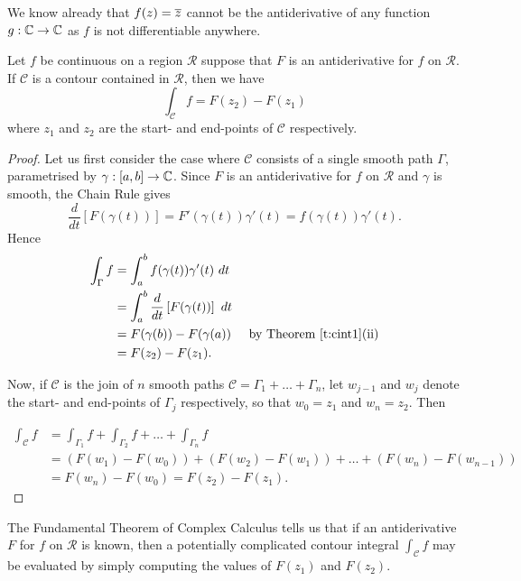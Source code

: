 We know already that $f(z)=\overline{z}$ cannot be the antiderivative of any function $g:\mathbb{C} \to \mathbb{C}$ as $f$ is not differentiable anywhere.
\begin{theorem}
\label{t:ftc}
Let $f$ be continuous on a region $\mathcal{R}$ suppose that $F$ is an antiderivative for $f$ on $\mathcal{R}$.  If $\mathcal{C}$ is a contour contained in $\mathcal{R}$, then we have
\[
\int_{\mathcal{C}} f = F( z_2)-F(z_1)
\]
where $z_1$ and $z_2$ are the start- and end-points of $\mathcal{C}$ respectively.
\end{theorem}
\begin{proof}

Let us first consider the case where $\mathcal{C}$ consists of a single smooth path $\Gamma$, parametrised by $\gamma:[a,b] \to \mathbb{C}$.  Since $F$ is an antiderivative for $f$ on $\mathcal{R}$ and $\gamma$ is smooth, the Chain Rule gives
\[
\frac{d}{dt} \left[ F( \gamma(t)) \right] = F'(\gamma(t))\gamma'(t) = f(\gamma(t))\gamma ' (t).
\]
Hence
\begin{align*}
\int_{\Gamma} f & = \int_a^b f(\gamma(t)) \gamma' (t)\ dt & \\
& = \int_a^b \frac{d}{dt} \left[ F( \gamma (t) ) \right]\ dt & \\
& = F ( \gamma (b) ) - F ( \gamma (a) ) & \text{ by Theorem~\ref{t:cint1}(ii)} \\
& = F(z_2)-F(z_1).
\end{align*}



Now, if $\mathcal{C}$ is the join of $n$ smooth paths $\mathcal{C} = \Gamma_1+\ldots + \Gamma_n$, let $w_{j-1}$ and $w_j$ denote the start- and end-points of $\Gamma_j$ respectively, so that $w_0=z_1$ and $w_n=z_2$.  Then

\begin{align*}
\int_{\mathcal{C}} f & = \int_{\Gamma_1} f + \int_{\Gamma_2} f + \ldots + \int_{\Gamma_n} f \\
& = \left( F(w_1)-F(w_0) \right) + \left( F(w_2)-F(w_1) \right) + \ldots + \left( F(w_n)-F(w_{n-1}) \right) \\
& = F(w_n)-F(w_0) = F(z_2)-F(z_1).
\end{align*}


\end{proof}
The Fundamental Theorem of Complex Calculus tells us that if an antiderivative $F$ for $f$ on $\mathcal{R}$ is known, then a potentially complicated contour integral $\int_{\mathcal{C}} f$ may be evaluated by simply computing the values of $F(z_1)$ and $F(z_2)$.

